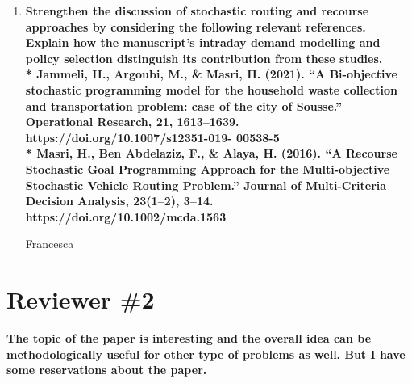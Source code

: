 \documentclass[11pt]{article}
\begin{document}
\begin{enumerate}
	  \item \textbf{Strengthen the discussion of stochastic routing and recourse approaches by considering
the following relevant references. Explain how the manuscript’s intraday demand
modelling and policy selection distinguish its contribution from these studies.\\
* Jammeli, H., Argoubi, M., \& Masri, H. (2021). “A Bi-objective stochastic programming
model for the household waste collection and transportation problem: case of the city of
Sousse.” Operational Research, 21, 1613–1639. https://doi.org/10.1007/s12351-019-
00538-5\\
* Masri, H., Ben Abdelaziz, F., \& Alaya, H. (2016). “A Recourse Stochastic Goal
Programming Approach for the Multi-objective Stochastic Vehicle Routing Problem.”
Journal of Multi-Criteria Decision Analysis, 23(1–2), 3–14.
https://doi.org/10.1002/mcda.1563}
	 
	 \vspace{1mm}
	Francesca
\end{enumerate}
 
 
\newpage
	\section*{Reviewer \#2}
 
	\vspace{3mm}

\textbf{The topic of the paper is interesting and the overall idea can be methodologically useful for other type of problems as well. But I have some reservations about the paper.}
\end{document}
